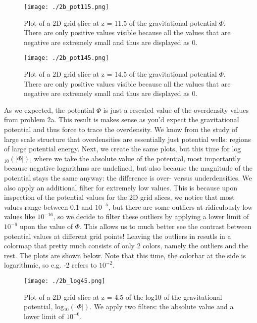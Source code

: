 \begin{figure}[h!]
  \centering
  \texttt{[image: ./2b\_pot115.png]}
  \caption{Plot of a 2D grid slice at z = 11.5 of the gravitational potential $\Phi$. There are only positive values visible because all the values that are negative are extremely small and thus are displayed as 0.}
\end{figure}

\begin{figure}[h!]
  \centering
  \texttt{[image: ./2b\_pot145.png]}
  \caption{Plot of a 2D grid slice at z = 14.5 of the gravitational potential $\Phi$. There are only positive values visible because all the values that are negative are extremely small and thus are displayed as 0.}
\end{figure}

\clearpage

As we expected, the potential $\Phi$ is just a rescaled value of the overdensity values from problem 2a. This result is makes sense as you'd expect the gravitational potential and thus force to trace the overdensity. We know from the study of large scale structure that overdensities are essentially just potential wells: regions of large potential energy. Next, we create the same plots, but this time for log$_{10}(|\Phi|)$, where we take the absolute value of the potential, most importantly because negative logarithms are undefined, but also because the magnitude of the potential stays the same anyway: the difference is over- versus underdensities. We also apply an additional filter for extremely low values. This is because upon inspection of the potential values for the 2D grid slices, we notice that most values range between 0.1 and $10^{-5}$, but there are some outliers at ridiculously low values like $10^{-16}$, so we decide to filter these outliers by applying a lower limit of $10^{-6}$ upon the value of $\Phi$. This allows us to much better see the contrast between potential values at different grid points! Leaving the outliers in resutls in a colormap that pretty much consists of only 2 colors, namely the outliers and the rest. The plots are shown below. Note that this time, the colorbar at the side is logarithmic, so e.g. -2 refers to $10^{-2}$. 

\begin{figure}[h!]
  \centering
  \texttt{[image: ./2b\_log45.png]}
  \caption{Plot of a 2D grid slice at z = 4.5 of the log10 of the gravitational potential, log$_10(|\Phi|)$. We apply two filters: the absolute value and a lower limit of $10^{-6}$.}
\end{figure}

